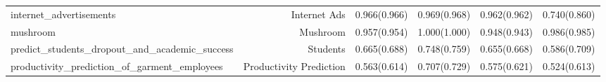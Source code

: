\begin{table}[!htbp]
\begin{adjustbox}{max width=\textwidth}
\begin{tabular}{lrrrrr}
internet\_advertisements & Internet Ads & 0.966(0.966) & 0.969(0.968) & 0.962(0.962) & 0.740(0.860) \\
mushroom & Mushroom & 0.957(0.954) & 1.000(1.000) & 0.948(0.943) & 0.986(0.985) \\
predict\_students\_dropout\_and\_academic\_success & Students & 0.665(0.688) & 0.748(0.759) & 0.655(0.668) & 0.586(0.709) \\
productivity\_prediction\_of\_garment\_employees & Productivity Prediction & 0.563(0.614) & 0.707(0.729) & 0.575(0.621) & 0.524(0.613) \\
\bottomrule
\end{tabular}
\end{adjustbox}
\end{table}
